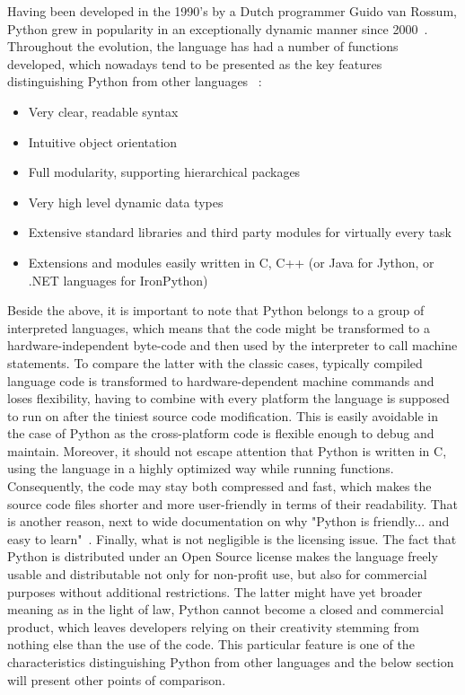 Having been developed in the 1990's by a Dutch programmer Guido van Rossum, Python grew in popularity in an exceptionally dynamic manner since 2000~\cite{py_code_swarm}. Throughout the evolution, the language has had a number of functions developed, which nowadays tend to be presented as the key features distinguishing Python from other languages ~\cite{py_about}:
\begin{itemize}
\item{Very clear, readable syntax}
\item{Intuitive object orientation}
\item{Full modularity, supporting hierarchical packages}
\item{Very high level dynamic data types}
\item{Extensive standard libraries and third party modules for virtually every task}
\item{Extensions and modules easily written in C, C++ (or Java for Jython, or .NET languages for IronPython)}
\end{itemize}
Beside the above, it is important to note that Python belongs to a group of interpreted languages, which means that the code might be transformed to a hardware-independent byte-code and then used by the interpreter to call machine statements. To compare the latter with the classic cases, typically compiled language code is transformed to hardware-dependent machine commands and loses flexibility, having to combine with every platform the language is supposed to run on after the tiniest source code modification. This is easily avoidable in the case of Python as the cross-platform code is flexible enough to debug and maintain. Moreover, it should not escape attention that Python is written in C, using the language in a highly optimized way while running functions. Consequently, the code may stay both compressed and fast, which makes the source code files shorter and more user-friendly in terms of their readability. That is another reason, next to wide documentation on why "Python is friendly... and easy to learn"~\cite{py_about}. Finally, what is not negligible is the licensing issue. The fact that Python is distributed under an Open Source license makes the language freely usable and distributable not only for non-profit use, but also for commercial purposes without additional restrictions. The latter might have yet broader meaning as in the light of law, Python cannot become a closed and commercial product, which leaves developers relying on their creativity stemming from nothing else than the use of the code. This particular feature is one of the characteristics distinguishing Python from other languages and the below section will present other points of comparison.

